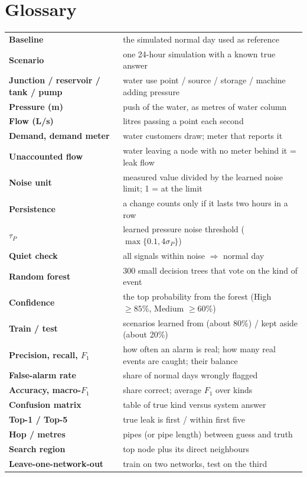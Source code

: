 \documentclass[11pt,a4paper]{article}
\begin{document}
\section{Glossary}
\begin{center}\small\begin{tabularx}{\linewidth}{@{}>{\bfseries}p{2.7cm}Y@{}}\toprule
Baseline & the simulated normal day used as reference \\
Scenario & one 24-hour simulation with a known true answer \\
Junction / reservoir / tank / pump & water use point / source / storage / machine adding pressure \\
Pressure (m) & push of the water, as metres of water column \\
Flow (L/s) & litres passing a point each second \\
Demand, demand meter & water customers draw; meter that reports it \\
Unaccounted flow & water leaving a node with no meter behind it = leak flow \\
Noise unit & measured value divided by the learned noise limit; 1 = at the limit \\
Persistence & a change counts only if it lasts two hours in a row \\
$\tau_P$ & learned pressure noise threshold ($\max\{0.1,4\sigma_P\}$) \\
Quiet check & all signals within noise $\Rightarrow$ normal day \\
Random forest & 300 small decision trees that vote on the kind of event \\
Confidence & the top probability from the forest (High $\ge85\%$, Medium $\ge60\%$) \\
Train / test & scenarios learned from (about 80\%) / kept aside (about 20\%) \\
Precision, recall, $F_1$ & how often an alarm is real; how many real events are caught; their balance \\
False-alarm rate & share of normal days wrongly flagged \\
Accuracy, macro-$F_1$ & share correct; average $F_1$ over kinds \\
Confusion matrix & table of true kind versus system answer \\
Top-1 / Top-5 & true leak is first / within first five \\
Hop / metres & pipes (or pipe length) between guess and truth \\
Search region & top node plus its direct neighbours \\
Leave-one-network-out & train on two networks, test on the third \\\bottomrule\end{tabularx}\end{center}
\end{document}

